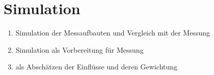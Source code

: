 \section{Simulation}
    \begin{enumerate}
        \item Simulation der Messaufbauten und Vergleich mit der Messung
        \item Simulation als Vorbereitung für Messung
        \item als Abschätzen der Einflüsse und deren Gewichtung
    \end{enumerate}